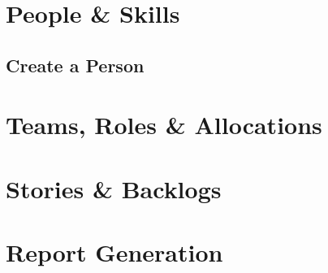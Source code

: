 \documentclass[11pt,fleqn]{book} %
\begin{document}
\section{People \& Skills}
\subsection{Create a Person}


\section{Teams, Roles \& Allocations}
\section{Stories \& Backlogs}
\section{Report Generation}
\end{document}
